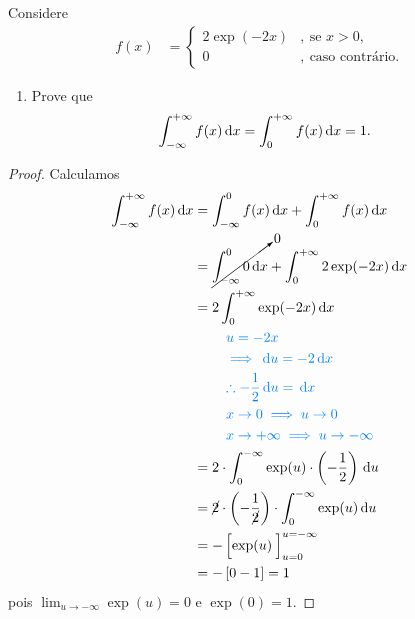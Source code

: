 \begin{example}
    Considere
    \begin{align*}
        f(x) &= \begin{cases}
            2\exp(-2x) &,\ \text{se }x > 0, \\
            0          &,\ \text{caso contrário}.
        \end{cases}
    \end{align*}
    
    \begin{enumerate}[label=(\alph*)]
        \item\label{it:ch-02-exp-media-fdp}
        Prove que \begin{align*}
            \int_{-\infty}^{+\infty} f(x) \,\mathrm{d} x
            &= \int_0^{+\infty} f(x) \,\mathrm{d} x = 1.
        \end{align*}
    \end{enumerate}

    \bigskip
    \begin{proof}
        Calculamos
        \begin{align*}
            \int_{-\infty}^{+\infty} f(x) \wrt x
            &= \int_{-\infty}^{0} f(x) \wrt x
                + \int_{0}^{+\infty} f(x) \wrt x \\
            &= \cancelto{0}{\int_{-\infty}^{0} 0 \wrt x}
                + \int_{0}^{+\infty} 2\exp(-2x) \wrt x \\
            &= 2 \int_{0}^{+\infty} \exp(-2x) \wrt x \\
            &\phantom{===}
                \detail{u = -2x} \\
            &\phantom{===}
                \detail{\implies \wrt u = -2 \wrt x} \\
            &\phantom{===}
                \detail{\therefore -\frac{1}{2}\wrt u = \wrt x} \\
            &\phantom{===}
                \detail{x \to 0 \implies u \to 0} \\
            &\phantom{===}
                \detail{x \to +\infty \implies u \to -\infty} \\
            &= 2 \cdot \int_{0}^{-\infty}
                \exp(u) \cdot 
                \left(-\frac{1}{2}\right)
                \wrt u \\
            &= \cancel{2} \cdot \left(-\frac{1}{\cancel{2}}\right)
                \cdot \int_{0}^{-\infty}
                \exp(u)
                \wrt u \\
            &= -\left[\exp(u)
                \phantom{\frac{}{}}
                \right]_{u=0}^{u=-\infty} \\
            &= -\left[0 - 1\right] = 1
        \end{align*}
        pois $\lim_{u \to -\infty} \exp(u) = 0$ e $\exp(0) = 1$.
    \end{proof}


\end{example}
